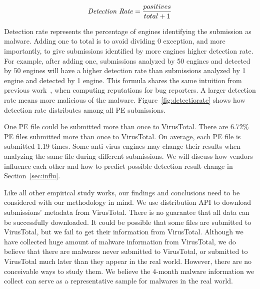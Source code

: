 $$ \textrm{\textit{Detection Rate}} = \dfrac{positives}{total + 1}$$

Detection rate represents the percentage of engines identifying the submission as malware. 
Adding one to total is to avoid dividing 0 exception, and more importantly, 
to give submissions identified by more engines higher detection rate. 
For example, after adding one, submissions analyzed by 50 engines and detected by 50 engines will have a higher detection rate 
than submissions analyzed by 1 engine and detected by 1 engine. 
This formula shares the same intuition from previous work~\cite{GuoICSE2010}, when computing reputations for bug reporters. 
A larger detection rate means more malicious of the malware. 
Figure~\ref{fig:detectiorate} shows how detection rate distributes among all PE submissions. 


One PE file could be submitted more than once to VirusTotal. 
There are 6.72\% PE files submitted more than once to VirusTotal. 
On average, each PE file is submitted 1.19 times. 
Some anti-virus engines may change their results when analyzing the same file during different submissions.
We will discuss how vendors influence each other and how to predict possible detection result change in Section~\ref{sec:influ}.

Like all other empirical study works, 
our findings and conclusions need to be considered with our methodology in mind. 
We use distribution API to download submissions' metadata from VirusTotal. 
There is no guarantee that all data can be successfully downloaded. 
It could be possible that some files are submitted to VirusTotal, 
but we fail to get their information from VirusTotal.
Although we have collected huge amount of malware information from VirusTotal,
we do believe that there are malwares never submitted to VirusTotal, 
or submitted to VirusTotal much later than they appear in the real world. 
However, there are no conceivable ways to study them.
We believe the 4-month malware information we collect can serve as a representative sample for malwares in the real world. 
